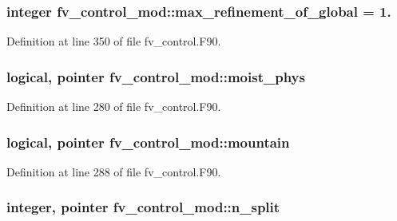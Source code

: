 \subsubsection[{max\-\_\-refinement\-\_\-of\-\_\-global}]{\setlength{\rightskip}{0pt plus 5cm}integer fv\-\_\-control\-\_\-mod\-::max\-\_\-refinement\-\_\-of\-\_\-global = 1.\hspace{0.3cm}{\ttfamily [private]}}\label{classfv__control__mod_a52a5e694a3dff2419b9cab131ffbdcbb}


Definition at line 350 of file fv\-\_\-control.\-F90.

\subsubsection[{moist\-\_\-phys}]{\setlength{\rightskip}{0pt plus 5cm}logical, pointer fv\-\_\-control\-\_\-mod\-::moist\-\_\-phys\hspace{0.3cm}{\ttfamily [private]}}\label{classfv__control__mod_ac0a394d19dca47dbadf863da0f8237c5}


Definition at line 280 of file fv\-\_\-control.\-F90.

\subsubsection[{mountain}]{\setlength{\rightskip}{0pt plus 5cm}logical, pointer fv\-\_\-control\-\_\-mod\-::mountain\hspace{0.3cm}{\ttfamily [private]}}\label{classfv__control__mod_a4491cd64caa35ee066a3a6a22331c33b}


Definition at line 288 of file fv\-\_\-control.\-F90.

\subsubsection[{n\-\_\-split}]{\setlength{\rightskip}{0pt plus 5cm}integer, pointer fv\-\_\-control\-\_\-mod\-::n\-\_\-split\hspace{0.3cm}{\ttfamily [private]}}\label{classfv__control__mod_a77f7e22e7cf16d6eb172e70cc2d00978}


